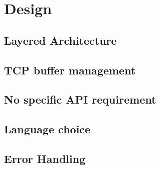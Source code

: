 
\section{Design}
    \subsection{Layered Architecture}
    \subsection{TCP buffer management}
    \subsection{No specific API requirement}
    \subsection{Language choice}
    \subsection{Error Handling}
